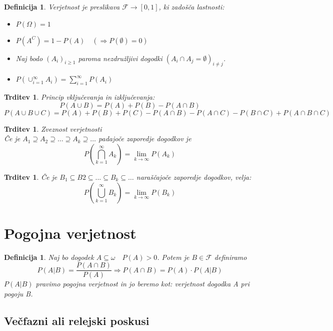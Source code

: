 \documentclass[11pt]{article}
\newtheorem{Trditev}[Izrek]{{\sc Trditev}}
\newtheorem{Definicija}[Izrek]{{\sc Definicija}}
\begin{document}
	\begin{Definicija}
		Verjetnost je preslikava $\mathcal{F}\to [0,1]$, ki zadošča lastnosti:
		\begin{itemize}
			\item
			$P(\Omega) = 1$
			\item
			$P(A^C) = 1 - P(A) \quad (\Rightarrow P(\emptyset) = 0)$
			\item
			Naj bodo $(A_i)_{i \ge 1} $ paroma nezdružljivi dogodki $(A_i \cap A_j = \emptyset)_{i\neq j}$.
			\item
			$P(\cup_{i =1}^{\infty}A_i) = \sum_{i = 1}^{\infty}P(A_i)$
		\end{itemize}
	\end{Definicija}
	
	\begin{Trditev}
		Princip vključevanja in izključevanja:
		$$P(A\cup B  ) = P(A) + P(B) - P(A \cap B)$$
		$$P(A \cup B \cup C) = P(A) + P(B) + P(C) - P(A \cap B) - P(A \cap C ) - P(B \cap C) + P(A\cap B \cap C)$$
	\end{Trditev}
	
	\begin{Trditev}
		Zveznost verjetnosti
		\\
		Če je $A_1 \supseteq A_2 \supseteq \dots \supseteq A_k \supseteq \dots $ padajoče zaporedje dogodkov je 
		\[
		P(\bigcap_{k=1}^{\infty} A_k) = \lim\limits_{k \to \infty}{P(A_k)}
		\]
	\end{Trditev}
	\begin{Trditev}
		Če je $ B_1 \subseteq B2 \subseteq ... \subseteq B_k \subseteq \dots$ naraščajoče zaporedje dogodkov, velja:
		\[
		P(\bigcup_{k=1}^{\infty} B_k) = \lim\limits_{k \to \infty}{P(B_k)}
		\]
	\end{Trditev}
	\section{Pogojna verjetnost}
	\begin{Definicija}
		Naj bo dogodek $A \subseteq \omega \quad P(A) > 0$.
		Potem je $B\in \mathcal{F}$ definiramo $$P(A|B) = \frac{P(A \cap B)}{P(A)} \Rightarrow P(A\cap B) = P(A) \cdot P(A|B)$$
		$P(A|B)$ pravimo pogojna verjetnost in jo beremo kot: verjetnost dogodka A pri pogoju B.
	\end{Definicija}
	
	\subsection{Večfazni ali relejski poskusi}
\end{document}
